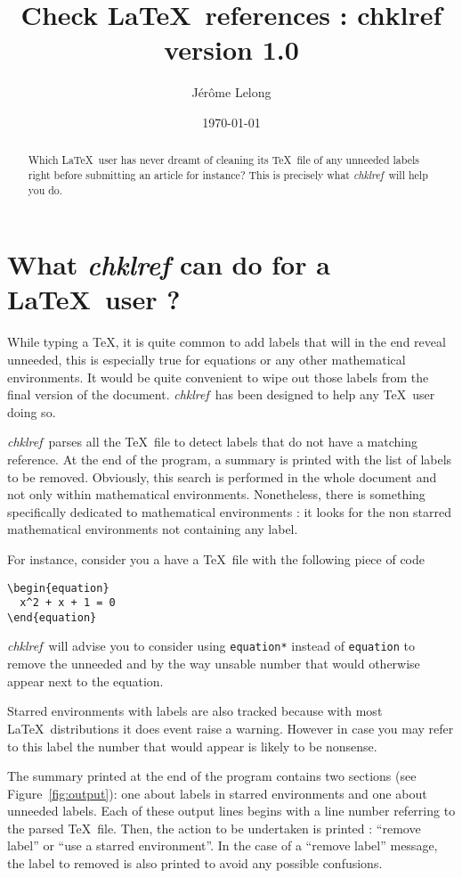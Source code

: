 \documentclass[a4paper,11pt,twoside]{article}
\title{Check \LaTeX\ references : chklref\\
{\large version 1.0}}
\date{\today}
\author{J\'er\^ome Lelong}
\def\chk{{\it chklref}}
\def\page{}%
\def\page{\HCode{<div id='page'>}}%
\begin{document}
\page
\maketitle

\begin{abstract} Which \LaTeX\ user has never dreamt of cleaning its \TeX\ file
  of any unneeded labels right before submitting an article for instance? This
  is precisely what \chk\ will help you do.
\end{abstract}

\section{What {\it chklref} can do for a \LaTeX\ user ?}

While typing a \TeX, it is quite common to add labels that will in the end
reveal unneeded, this is especially true for equations or any other mathematical
environments. It would be quite convenient to wipe out those labels from the
final version of the document. \chk\ has been designed to help any \TeX\
user doing so.

\chk\ parses all the \TeX\ file to detect labels that do not have a matching
reference. At the end of the program, a summary is printed with the list of
labels to be removed. Obviously, this search is performed in the whole document
and not only within mathematical environments. Nonetheless, there is something
specifically dedicated to mathematical environments : it looks for the non
starred mathematical environments not containing any label.

For instance, consider you a have a \TeX\ file with the following piece of code
\begin{verbatim}
\begin{equation}
  x^2 + x + 1 = 0
\end{equation}
\end{verbatim}
\chk\ will advise you to consider using \verb!equation*! instead of
\verb!equation! to remove the unneeded and by the way unsable number that would
otherwise appear next to the equation.

Starred environments with labels are also tracked because with most \LaTeX\
distributions it does event raise a warning. However in case you may refer to
this label the number that would appear is likely to be nonsense.

The summary printed at the end of the program contains two sections (see
Figure~\ref{fig:output}): one about labels in starred environments and one about
unneeded labels. Each of these output lines begins with a line number referring
to the parsed \TeX\ file. Then, the action to be undertaken is printed :
``remove label'' or ``use a starred environment''. In the case of a ``remove
label'' message, the label to removed is also printed to avoid any possible
confusions.
\end{document}
